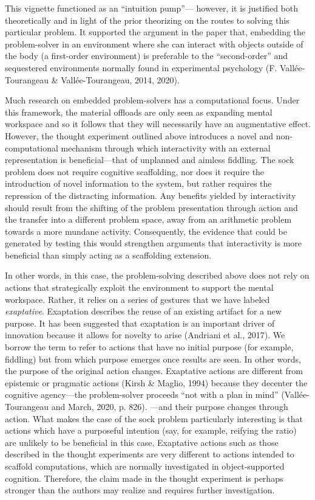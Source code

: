 This vignette functioned as an ``intuition pump''--- however, it is
justified both theoretically and in light of the prior theorizing on the
routes to solving this particular problem. It supported the argument in
the paper that, embedding the problem-solver in an environment where she
can interact with objects outside of the body (a first-order
environment) is preferable to the ``second-order'' and sequestered
environments normally found in experimental psychology (F.
Vallée‐Tourangeau \& Vallée-Tourangeau, 2014, 2020).

Much research on embedded problem-solvers has a computational focus.
Under this framework, the material offloads are only seen as expanding
mental workspace and so it follows that they will necessarily have an
augmentative effect. However, the thought experiment outlined above
introduces a novel and non-computational mechanism through which
interactivity with an external representation is beneficial---that of
unplanned and aimless fiddling. The sock problem does not require
cognitive scaffolding, nor does it require the introduction of novel
information to the system, but rather requires the repression of the
distracting information. Any benefits yielded by interactivity should
result from the shifting of the problem presentation through action and
the transfer into a different problem space, away from an arithmetic
problem towards a more mundane activity. Consequently, the evidence that
could be generated by testing this would strengthen arguments that
interactivity is more beneficial than simply acting as a scaffolding
extension.

In other words, in this case, the problem-solving described above does
not rely on actions that strategically exploit the environment to
support the mental workspace. Rather, it relies on a series of gestures
that we have labeled \emph{exaptative}. Exaptation describes the reuse
of an existing artifact for a new purpose. It has been suggested that
exaptation is an important driver of innovation because it allows for
novelty to arise (Andriani et al., 2017). We borrow the term to refer to
actions that have no initial purpose (for example, fiddling) but from
which purpose emerges once results are seen. In other words, the purpose
of the original action changes. Exaptative actions are different from
epistemic or pragmatic actions (Kirsh \& Maglio, 1994) because they
decenter the cognitive agency---the problem-solver proceeds ``not with a
plan in mind'' (Vallée-Tourangeau and March, 2020, p. 826). ---and their
purpose changes through action. What makes the case of the sock problem
particularly interesting is that actions which have a purposeful
intention (say, for example, reifying the ratio) are unlikely to be
beneficial in this case. Exaptative actions such as those described in
the thought experiments are very different to actions intended to
scaffold computations, which are normally investigated in
object-supported cognition. Therefore, the claim made in the thought
experiment is perhaps stronger than the authors may realize and requires
further investigation.


